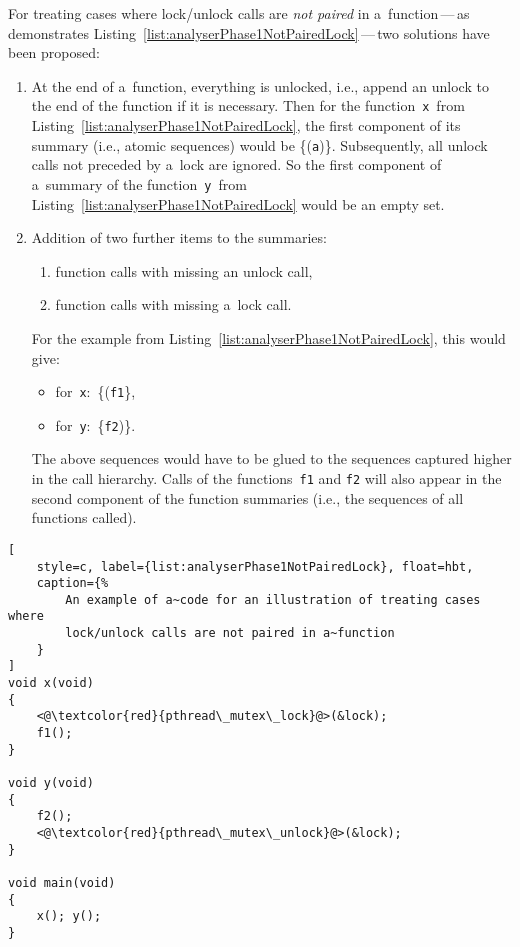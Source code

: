 For treating cases where lock/unlock calls are \emph{not paired} in
a~function\,---\,as demonstrates
Listing~\ref{list:analyserPhase1NotPairedLock}\,---\,two solutions
have been proposed:
\begin{enumerate}
    \item
        At the end of a~function, everything is unlocked, i.e., append
        an unlock to the end of the function if it is necessary. Then
        for the function~\texttt{x}~from
        Listing~\ref{list:analyserPhase1NotPairedLock}, the first component
        of its summary (i.e., atomic sequences) would be \{(\texttt{a})\}.
        Subsequently, all unlock calls not preceded by a~lock are
        ignored. So the first component of a~summary of the
        function~\texttt{y}~from
        Listing~\ref{list:analyserPhase1NotPairedLock} would be an empty set.

    \item
        Addition of two further items to the summaries:
        \begin{enumerate}[label={(\alph*)}]
            \item
                function calls with missing an unlock call,

            \item
                function calls with missing a~lock call.
        \end{enumerate}
        For the example from Listing~\ref{list:analyserPhase1NotPairedLock},
        this would give:
        \begin{itemize}
            \item
                for~\texttt{x}:~\{(\texttt{f1}\},

            \item
                for~\texttt{y}:~\{\texttt{f2})\}.
        \end{itemize}
        The above sequences would have to be glued to the sequences
        captured higher in the call hierarchy. Calls of the
        functions~\texttt{f1} and \texttt{f2} will also appear in
        the second component of the function summaries (i.e., the sequences
        of all functions called).
\end{enumerate}

\begin{lstlisting}[
    style=c, label={list:analyserPhase1NotPairedLock}, float=hbt,
    caption={%
        An example of a~code for an illustration of treating cases where
        lock/unlock calls are not paired in a~function
    }
]
void x(void)
{
    <@\textcolor{red}{pthread\_mutex\_lock}@>(&lock);
    f1();
}

void y(void)
{
    f2();
    <@\textcolor{red}{pthread\_mutex\_unlock}@>(&lock);
}

void main(void)
{
    x(); y();
}
\end{lstlisting}

